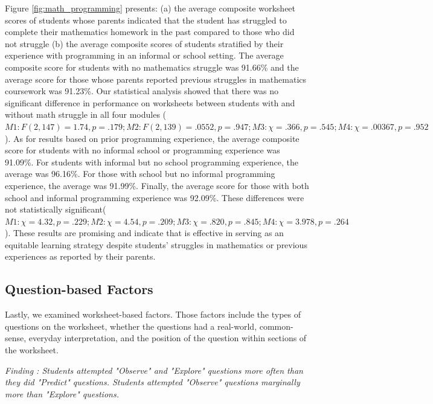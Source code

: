 Figure \ref{fig:math_programming} presents: (a) the average composite \ts{} worksheet scores of students whose parents indicated that the student has struggled to complete their mathematics homework in the past compared to those who did not struggle (b) the average composite scores of students stratified by their experience with programming in an informal or school setting. The average \ts{} composite score for students with no mathematics struggle was 91.66\% and the average score for those whose parents reported previous struggles in mathematics coursework was 91.23\%. Our statistical analysis showed that there was no significant difference in performance on \ts{} worksheets between students with and without math struggle in all four modules ($M1: F(2, 147)=1.74, p=.179; M2: F(2,139)=.0552, p=.947; M3: \chi=.366, p=.545; M4: \chi=.00367, p=.952$). As for results based on prior programming experience, the average \ts{} composite score for students with no informal school or programming experience was 91.09\%. For students with informal but no school programming experience, the average was 96.16\%. For those with school but no informal programming experience, the average was 91.99\%. Finally, the average score for those with both school and informal programming experience was 92.09\%. These differences were not statistically significant($M1: \chi=4.32, p=.229; M2: \chi=4.54, p=.209; M3: \chi=.820, p=.845; M4: \chi=3.978, p=.264$). These results are promising and indicate that \ts{} is effective in serving as an equitable learning strategy despite students' struggles in mathematics or previous experiences as reported by their parents.

\subsection{Question-based Factors}
 \label{qb-factors}
 
Lastly, we examined worksheet-based factors. Those factors include the types of questions on the worksheet, whether the questions had a real-world, common-sense, everyday interpretation, and the position of the question within sections of the worksheet. 

\textit{Finding : Students attempted "Observe" and "Explore" questions more often than they did "Predict" questions. Students attempted "Observe" questions marginally more than "Explore" questions.}

